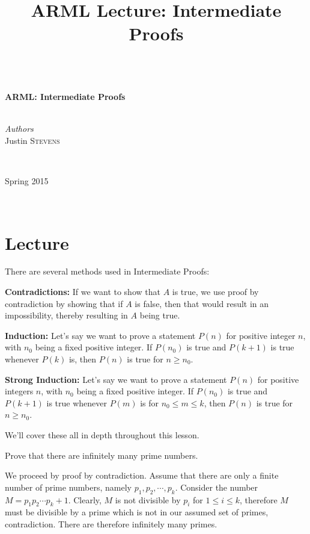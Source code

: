 
\title{ARML Lecture:  Intermediate Proofs}

\begin{center}
\HRule \\[0.4cm]
{ \huge \bfseries ARML: Intermediate Proofs}\\[0.4cm] %
\HRule \\[1.5cm]
\begin{minipage}{0.4\textwidth}
\begin{flushleft} \large
\emph{Authors}\\
Justin \textsc{Stevens} \newline
\end{flushleft}
\end{minipage}
~
\begin{minipage}{0.4\textwidth}
\begin{flushright} \large
Spring 2015
\end{flushright}
\end{minipage}\\[0.5cm]
\end{center}

\section{Lecture}

There are several methods used in Intermediate Proofs:  

\textbf{Contradictions:}  If we want to show that $A$ is true, we use proof by contradiction by showing that if $A$ is false, then that would result in an impossibility, thereby resulting in $A$ being true.  

\textbf{Induction:}  Let's say we want to prove a statement $P(n)$ for positive integer $n$, with $n_0$ being a fixed positive integer.  If $P(n_0)$ is true and $P(k+1)$ is true whenever $P(k)$ is, then $P(n)$ is true for $n\ge n_0$.  

\textbf{Strong Induction:}  Let's say we want to prove a statement $P(n)$ for positive integers $n$, with $n_0$ being a fixed positive integer.  If $P(n_0)$ is true and $P(k+1)$ is true whenever $P(m)$ is for $n_0 \le m\le k$, then $P(n)$ is true for $n\ge n_0$.

We'll cover these all in depth throughout this lesson.

\begin{exmp}  Prove that there are infinitely many prime numbers. \end{exmp}
\begin{soln}  We proceed by proof by contradiction.  Assume that there are only a finite number of prime numbers, namely $p_1, p_2, \cdots, p_k$.  Consider the number $M=p_1p_2\cdots p_k+1$.  Clearly, $M$ is not divisible by $p_i$ for $1\le i\le k$, therefore $M$ must be divisible by a prime which is not in our assumed set of primes, contradiction.  There are therefore infinitely many primes.  \end{soln}

